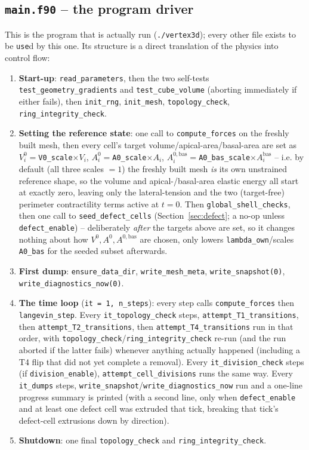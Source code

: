 \documentclass[11pt,a4paper]{report}
\begin{document}
\subsection{\texttt{main.f90} -- the program driver}
\label{sec:main-code}
This is the program that is actually run (\texttt{./vertex3d}); every
other file exists to be \texttt{use}d by this one. Its structure is a
direct translation of the physics into control flow:
\begin{enumerate}
  \item \textbf{Start-up}: \texttt{read\_parameters}, then the two
  self-tests \texttt{test\_geometry\_gradients} and
  \texttt{test\_cube\_volume} (aborting immediately if either fails),
  then \texttt{init\_rng}, \texttt{init\_mesh},
  \texttt{topology\_check}, \texttt{ring\_integrity\_check}.
  \item \textbf{Setting the reference state}: one call to
  \texttt{compute\_forces} on the freshly built mesh, then every
  cell's target volume/apical-area/basal-area are set as
  $V^0_i=$\texttt{V0\_scale}$\times V_i$,
  $A^0_i=$\texttt{A0\_scale}$\times A_i$,
  $A^{0,\mathrm{bas}}_i=$\texttt{A0\_bas\_scale}$\times A^{\mathrm{bas}}_i$
  -- i.e. by default (all three scales $=1$) the freshly built mesh
  \emph{is} its own unstrained reference shape, so the volume and
  apical-/basal-area elastic energy all start at exactly zero, leaving
  only the lateral-tension and the two (target-free) perimeter
  contractility terms active at $t=0$. Then \texttt{global\_shell\_checks},
  then one call to \texttt{seed\_defect\_cells} (Section~\ref{sec:defect};
  a no-op unless \texttt{defect\_enable}) -- deliberately \emph{after}
  the targets above are set, so it changes nothing about how
  $V^0,A^0,A^{0,\mathrm{bas}}$ are chosen, only lowers
  \texttt{lambda\_own}/scales \texttt{A0\_bas} for the seeded subset
  afterwards.
  \item \textbf{First dump}: \texttt{ensure\_data\_dir},
  \texttt{write\_mesh\_meta}, \texttt{write\_snapshot(0)},
  \texttt{write\_diagnostics\_now(0)}.
  \item \textbf{The time loop} (\texttt{it = 1, n\_steps}): every step
  calls \texttt{compute\_forces} then \texttt{langevin\_step}. Every
  \texttt{it\_topology\_check} steps, \texttt{attempt\_T1\_transitions},
  then \texttt{attempt\_T2\_transitions}, then \texttt{attempt\_T4\_transitions}
  run in that order, with
  \texttt{topology\_check}/\texttt{ring\_integrity\_check} re-run (and
  the run aborted if the latter fails) whenever anything actually
  happened (including a T4 flip that did not yet complete a removal).
  Every \texttt{it\_division\_check} steps (if
  \texttt{division\_enable}), \texttt{attempt\_cell\_divisions} runs the
  same way. Every \texttt{it\_dumps} steps,
  \texttt{write\_snapshot}/\texttt{write\_diagnostics\_now} run and a
  one-line progress summary is printed (with a second line, only when
  \texttt{defect\_enable} and at least one defect cell was extruded that
  tick, breaking that tick's defect-cell extrusions down by direction).
  \item \textbf{Shutdown}: one final \texttt{topology\_check} and
  \texttt{ring\_integrity\_check}.
\end{enumerate}
\end{document}
